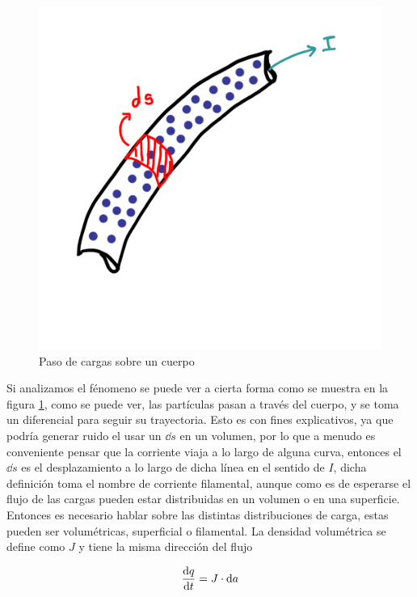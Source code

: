 \documentclass[11pt]{report}
\theoremstyle{plain}
\theoremstyle{definition}
\begin{document}
\begin{figure}[!h]
	\centering
	\includegraphics[scale=0.15]{corriente_instantanea}
	\caption{Paso de cargas sobre un cuerpo}
	\label{fig:corriente_instantanea}
\end{figure}


Si analizamos el fénomeno se puede ver a cierta forma como se muestra en la figura \ref{fig:corriente_instantanea}, como se puede ver, las partículas pasan a través del cuerpo, y se toma un diferencial para seguir su trayectoria. Esto es con fines explicativos, ya que podría generar ruido el usar un $\dd{s}$ en un volumen, por lo que a menudo es conveniente pensar que la corriente viaja a lo largo de alguna curva, entonces el $\dd{s}$ es el desplazamiento a lo largo de dicha línea en el sentido de $I$, dicha definición toma el nombre de corriente filamental, aunque como es de esperarse el flujo de las cargas pueden estar distribuidas en un volumen o en una superficie.\\

Entonces es necesario hablar sobre las distintas distribuciones de carga, estas pueden ser volumétricas, superficial o filamental. La densidad volumétrica se define como $J$ y tiene la misma dirección del flujo

\begin{equation}
	\dv{q}{t} = J \cdot \dd{a}
	\label{eq:corriente_vol}
\end{equation}
\end{document}
